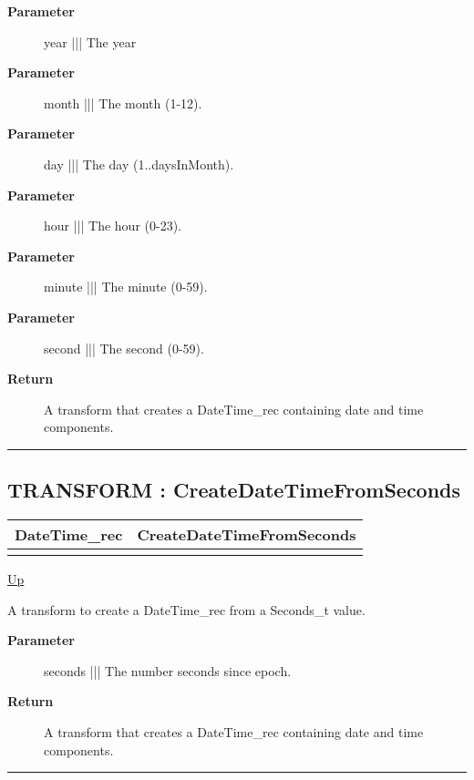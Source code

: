 \par
\begin{description}
\item [\textbf{Parameter}] year ||| The year
\item [\textbf{Parameter}] month ||| The month (1-12).
\item [\textbf{Parameter}] day ||| The day (1..daysInMonth).
\item [\textbf{Parameter}] hour ||| The hour (0-23).
\item [\textbf{Parameter}] minute ||| The minute (0-59).
\item [\textbf{Parameter}] second ||| The second (0-59).
\item [\textbf{Return}] A transform that creates a DateTime\_rec containing date and time components.
\end{description}

\rule{\textwidth}{0.4pt}
\subsection*{TRANSFORM : CreateDateTimeFromSeconds}
\hypertarget{ecldoc:date.createdatetimefromseconds}{}

{\renewcommand{\arraystretch}{1.5}
\begin{tabularx}{\textwidth}{|>{\raggedright\arraybackslash}l|X|}
\hline
\hspace{0pt}DateTime\_rec & CreateDateTimeFromSeconds \\
\hline
\multicolumn{2}{|>{\raggedright\arraybackslash}X|}{\hspace{0pt}(Seconds\_t seconds)} \\
\hline
\end{tabularx}
}

\hyperlink{ecldoc:Date}{Up}

\par
A transform to create a DateTime\_rec from a Seconds\_t value.

\par
\begin{description}
\item [\textbf{Parameter}] seconds ||| The number seconds since epoch.
\item [\textbf{Return}] A transform that creates a DateTime\_rec containing date and time components.
\end{description}

\rule{\textwidth}{0.4pt}


